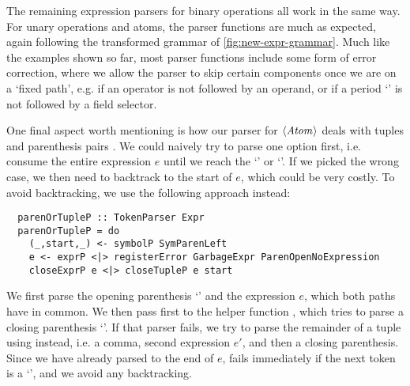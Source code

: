 The remaining expression parsers for binary operations all work in the same way.
For unary operations and atoms, the parser functions are much as expected, again
following the transformed grammar of \cref{fig:new-expr-grammar}.
Much like the examples shown so far, most parser functions include some form of
error correction, where we allow the parser to skip certain components once we
are on a `fixed path', e.g. if an operator is not followed by an
operand, or if a period `' is not followed by a field selector.

One final aspect worth mentioning is how our parser for $\langle \textit{Atom}\kern.7pt \rangle$ deals
with tuples  and parenthesis pairs .
We could naively try to parse one option first, i.e. consume
the entire expression $e$ until we reach the `\code{,}' or `\code{)}'.
If we picked the wrong case, we then need to backtrack to the start of $e$,
which could be very costly.
To avoid backtracking, we use the following approach instead:
\begin{verbatim}
  parenOrTupleP :: TokenParser Expr
  parenOrTupleP = do
    (_,start,_) <- symbolP SymParenLeft
    e <- exprP <|> registerError GarbageExpr ParenOpenNoExpression
    closeExprP e <|> closeTupleP e start
\end{verbatim}
%
We first parse the opening parenthesis `\code{(}' and the expression $e$, which
both paths have in common.
We then pass  first to the helper function
, which tries to parse a closing parenthesis `\code{)}'.
If that parser fails, we try to parse the remainder of a tuple using
 instead, i.e. a comma, second expression $e'$, and then a
closing parenthesis.
Since we have already parsed to the end of $e$,  fails
immediately if the next token is a `\code{,}', and we avoid any backtracking.


